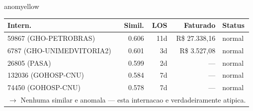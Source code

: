 \documentclass[a4paper,10pt]{article}
\begin{document}
\begin{anomalycard}[Internacao 164473 | GHO-PETROBRAS | MODERADO (z=2.53)]{anomyellow}
\begin{tabular}{l r r r l}\toprule\textbf{Intern.} & \textbf{Simil.} & \textbf{LOS} & \textbf{Faturado} & \textbf{Status} \\\midrule
59867 (GHO-PETROBRAS) & 0.606 & 11d & R\$ 27.338,16 & \textcolor{jcubeblue}{normal} \\
6787 (GHO-UNIMEDVITORIA2) & 0.601 & 3d & R\$ 3.527,08 & \textcolor{jcubeblue}{normal} \\
26805 (PASA) & 0.599 & 2d & --- & \textcolor{jcubeblue}{normal} \\
132036 (GOHOSP-CNU) & 0.584 & 7d & --- & \textcolor{jcubeblue}{normal} \\
74450 (GOHOSP-CNU) & 0.578 & 7d & --- & \textcolor{jcubeblue}{normal} \\
\multicolumn{5}{l}{\textcolor{jcubeblue}{\small $\rightarrow$ Nenhuma similar e anomala --- esta internacao e verdadeiramente atipica.}} \\
\bottomrule\end{tabular}


\end{anomalycard}

\newpage
\end{document}
